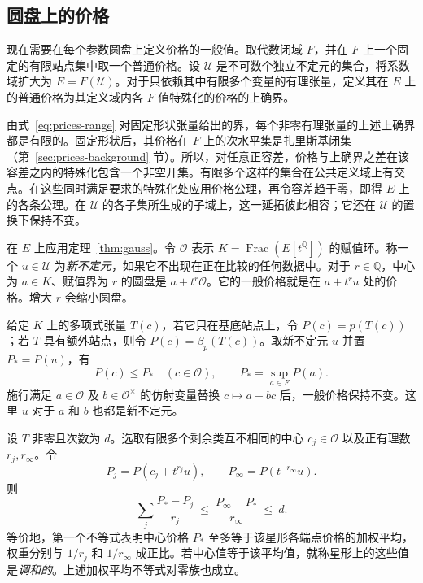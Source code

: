 \subsection{圆盘上的价格}

现在需要在每个参数圆盘上定义价格的一般值。取代数闭域 $F$，并在 $F$ 上一个固定的有限站点集中取一个普通价格。设 $\mathcal U$ 是不可数个独立不定元的集合，将系数域扩大为 $E=F(\mathcal U)$。对于只依赖其中有限多个变量的有理张量，定义其在 $E$ 上的普通价格为其定义域内各 $F$ 值特殊化的价格的上确界。

由式~\eqref{eq:prices-range} 对固定形状张量给出的界，每个非零有理张量的上述上确界都是有限的。固定形状后，其价格在 $F$ 上的次水平集是扎里斯基闭集（第~\ref{sec:prices-background} 节）。所以，对任意正容差，价格与上确界之差在该容差之内的特殊化包含一个非空开集。有限多个这样的集合在公共定义域上有交点。在这些同时满足要求的特殊化处应用价格公理，再令容差趋于零，即得 $E$ 上的各条公理。在 $\mathcal U$ 的各子集所生成的子域上，这一延拓彼此相容；它还在 $\mathcal U$ 的置换下保持不变。

在 $E$ 上应用定理~\ref{thm:gauss}。令 $\mathcal O$ 表示 $K=\operatorname{Frac}(E[t^{\mathbb Q}])$ 的赋值环。称一个 $u\in\mathcal U$ 为\emph{新不定元}，如果它不出现在正在比较的任何数据中。对于 $r\in\mathbb Q$，中心为 $a\in K$、赋值界为 $r$ 的圆盘是 $a+t^r\mathcal O$。它的一般价格就是在 $a+t^r u$ 处的价格。增大 $r$ 会缩小圆盘。

\begin{lemma}[特殊化与星形不等式]\label{lem:star}
给定 $K$ 上的多项式张量 $T(c)$，若它只在基底站点上，令 $P(c)=p(T(c))$；若 $T$ 具有额外站点，则令 $P(c)=\beta_p(T(c))$。取新不定元 $u$ 并置 $P_*=P(u)$，有
\[
 P(c)\le P_* \quad (c\in\mathcal O), \qquad P_*=\sup_{a\in F}P(a).
\]
施行满足 $a\in\mathcal O$ 及 $b\in\mathcal O^\times$ 的仿射变量替换 $c\mapsto a+bc$ 后，一般价格保持不变。这里 $u$ 对于 $a$ 和 $b$ 也都是新不定元。

设 $T$ 非零且次数为 $d$。选取有限多个剩余类互不相同的中心 $c_j\in\mathcal O$ 以及正有理数 $r_j,r_\infty$。令
\[
 P_j=P(c_j+t^{r_j}u),\qquad P_\infty=P(t^{-r_\infty}u).
\]
则
\begin{equation}\label{eq:valued-star}
 \sum_j\frac{P_*-P_j}{r_j}
 \ \le\ \frac{P_\infty-P_*}{r_\infty}\ \le\ d .
\end{equation}
等价地，第一个不等式表明中心价格 $P_*$ 至多等于该星形各端点价格的加权平均，权重分别与 $1/r_j$ 和 $1/r_\infty$ 成正比。若中心值等于该平均值，就称星形上的这些值是\emph{调和的}。上述加权平均不等式对零族也成立。
\end{lemma}

